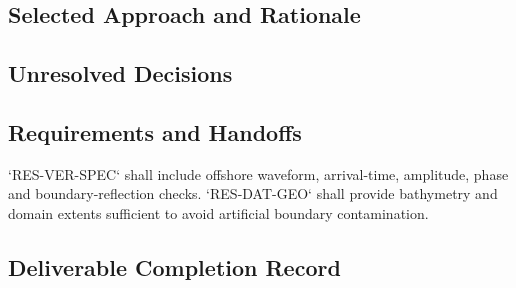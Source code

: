 \subsection{Selected Approach and Rationale}
\label{sec:res-phy-pro-selected-approach}


\subsection{Unresolved Decisions}
\label{sec:res-phy-pro-unresolved-decisions}


\subsection{Requirements and Handoffs}
\label{sec:res-phy-pro-requirements}


`RES-VER-SPEC` shall include offshore waveform, arrival-time,
amplitude, phase and boundary-reflection checks. `RES-DAT-GEO` shall
provide bathymetry and domain extents sufficient to avoid artificial
boundary contamination.

\subsection{Deliverable Completion Record}
\label{sec:res-phy-pro-completion-record}

%
%
%
